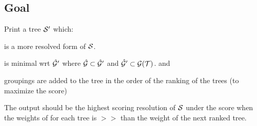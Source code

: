 \documentclass[11pt]{article}
\begin{document}
\subsection*{Goal}
Print a tree $\mathcal{S}^{\prime}$ which:
\begin{compactitem}
    \item is a more resolved form of $\mathcal{S}$.
    \item is minimal wrt $\hat{\mathcal{G}}^{\prime}$ where $\hat{\mathcal{G}} \subset \hat{\mathcal{G}}^{\prime}$ and $\hat{\mathcal{G}}^{\prime} \subset \mathcal{G}(\mathcal{T})$. and 
    \item groupings are added to the tree in the order of the ranking of the trees (to maximize the \SWIPSD score)
\end{compactitem}

The output should be the highest scoring resolution of $\mathcal{S}$ under the \SWIPSD score when the
    weights of for each tree is $>>$ than the weight of the next ranked tree.
\end{document}
